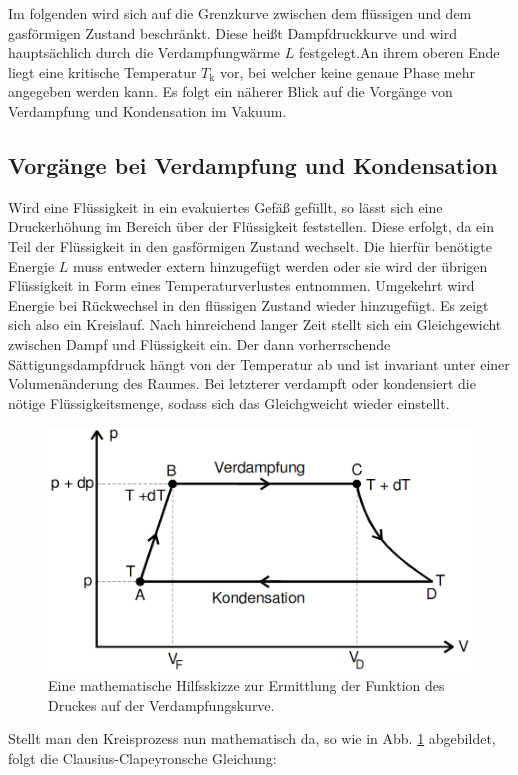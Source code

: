      Im folgenden wird sich auf die Grenzkurve zwischen dem flüssigen und dem
      gasförmigen Zustand beschränkt. Diese heißt Dampfdruckkurve und wird hauptsächlich durch die
      Verdampfungwärme $L$ festgelegt.An ihrem oberen Ende liegt eine kritische
       Temperatur $T_\text{k}$ vor, bei welcher keine genaue Phase mehr angegeben werden kann. Es folgt ein näherer Blick auf die Vorgänge von
      Verdampfung und Kondensation im Vakuum.
\subsection{Vorgänge bei Verdampfung und Kondensation}
Wird eine Flüssigkeit in ein evakuiertes Gefäß gefüllt, so lässt sich eine
 Druckerhöhung im Bereich über der Flüssigkeit feststellen. Diese erfolgt, da ein Teil der
  Flüssigkeit in den gasförmigen Zustand wechselt. Die hierfür benötigte
   Energie $L$ muss entweder extern hinzugefügt werden oder sie wird der übrigen
    Flüssigkeit in Form eines Temperaturverlustes entnommen. Umgekehrt wird
     Energie bei Rückwechsel in den flüssigen Zustand wieder hinzugefügt. Es
      zeigt sich also ein Kreislauf. Nach hinreichend langer Zeit stellt sich
       ein Gleichgewicht zwischen Dampf und Flüssigkeit ein. Der dann vorherrschende
        Sättigungsdampfdruck hängt von der Temperatur ab und ist invariant
         unter einer Volumenänderung des Raumes. Bei letzterer
         verdampft oder kondensiert die nötige Flüssigkeitsmenge, sodass sich das Gleichgweicht wieder einstellt.
         \begin{figure}
         	\centering
         	\includegraphics[width=\linewidth-150pt,height=\textheight-150pt,keepaspectratio]{content/Bilder/Kreislauf.png}
         	\caption{Eine mathematische Hilfsskizze zur Ermittlung der Funktion des Druckes auf der Verdampfungskurve\cite{V203}.}
         	\label{fig:Kreislauf}
         \end{figure}
         Stellt man den Kreisprozess nun mathematisch da, so wie in Abb. \ref{fig:Kreislauf} abgebildet, folgt die Clausius-Clapeyronsche Gleichung:
